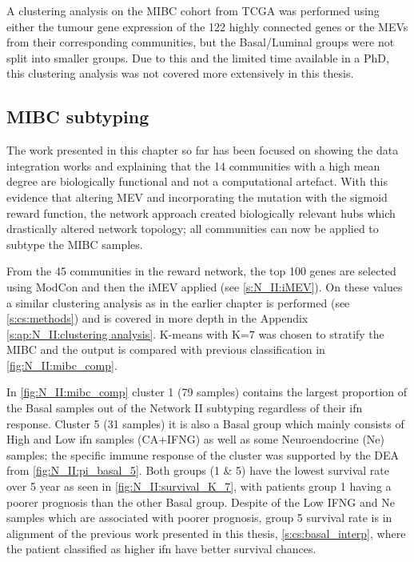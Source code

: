 A clustering analysis on the MIBC cohort from TCGA was performed using either the tumour gene expression of the 122 highly connected genes or the MEVs from their corresponding communities, but the Basal/Luminal groups were not split into smaller groups. Due to this and the limited time available in a PhD, this clustering analysis was not covered more extensively in this thesis.



\subsection{MIBC subtyping}

The work presented in this chapter so far has been focused on showing the data integration works and explaining that the 14 communities with a high mean degree are biologically functional and not a computational artefact. With this evidence that altering MEV and incorporating the mutation with the sigmoid reward function, the network approach created biologically relevant hubs which drastically altered network topology; all communities can now be applied to subtype the MIBC samples.

From the 45 communities in the reward network, the top 100 genes are selected using ModCon and then the iMEV applied (see \cref{s:N_II:iMEV}). On these values a similar clustering analysis as in the earlier chapter is performed (see \cref{s:cs:methods}) and is covered in more depth in the Appendix \cref{s:ap:N_II:clustering analysis}. K-means with K=7 was chosen to stratify the MIBC and the output is compared with previous classification in \cref{fig:N_II:mibc_comp}.


In \cref{fig:N_II:mibc_comp} cluster 1 (79 samples) contains the largest proportion of the Basal samples out of the Network II subtyping regardless of their \acrlong{ifn} response. Cluster 5 (31 samples) it is also a Basal group which mainly consists of High and Low \acrshort{ifn} samples (CA+IFNG) as well as some Neuroendocrine (Ne) samples; the specific immune response of the cluster was supported by the DEA from \cref{fig:N_II:pi_basal_5}. Both groups (1 \& 5) have the lowest survival rate over 5 year as seen in \cref{fig:N_II:survival_K_7}, with patients group 1 having a poorer prognosis than the other Basal group. Despite of the Low IFNG and Ne samples which are associated with poorer prognosis, group 5 survival rate is in alignment of the previous work presented in this thesis, \cref{s:cs:basal_interp}, where the patient classified as higher \acrshort{ifn} have better survival chances.

